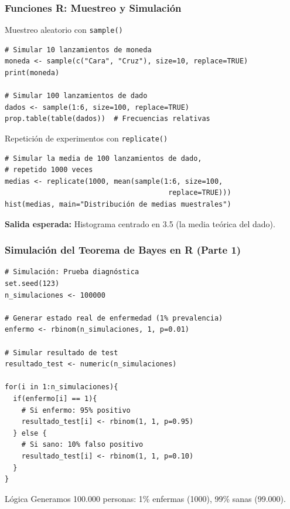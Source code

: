 \documentclass[aspectratio=169,11pt]{beamer}
\begin{document}
\begin{frame}[fragile]
\frametitle{Funciones R: Muestreo y Simulación}

\begin{block}{Muestreo aleatorio con \texttt{sample()}}
\begin{lstlisting}
# Simular 10 lanzamientos de moneda
moneda <- sample(c("Cara", "Cruz"), size=10, replace=TRUE)
print(moneda)

# Simular 100 lanzamientos de dado
dados <- sample(1:6, size=100, replace=TRUE)
prop.table(table(dados))  # Frecuencias relativas
\end{lstlisting}
\end{block}

\pause
\begin{block}{Repetición de experimentos con \texttt{replicate()}}
\begin{lstlisting}
# Simular la media de 100 lanzamientos de dado,
# repetido 1000 veces
medias <- replicate(1000, mean(sample(1:6, size=100,
                                       replace=TRUE)))
hist(medias, main="Distribución de medias muestrales")
\end{lstlisting}
\end{block}

\pause
\vspace{0.2cm}
\textbf{Salida esperada:} Histograma centrado en 3.5 (la media teórica del dado).
\end{frame}

\begin{frame}[fragile]
\frametitle{Simulación del Teorema de Bayes en R (Parte 1)}

\begin{lstlisting}[basicstyle=\ttfamily\tiny]
# Simulación: Prueba diagnóstica
set.seed(123)
n_simulaciones <- 100000

# Generar estado real de enfermedad (1% prevalencia)
enfermo <- rbinom(n_simulaciones, 1, p=0.01)

# Simular resultado de test
resultado_test <- numeric(n_simulaciones)

for(i in 1:n_simulaciones){
  if(enfermo[i] == 1){
    # Si enfermo: 95% positivo
    resultado_test[i] <- rbinom(1, 1, p=0.95)
  } else {
    # Si sano: 10% falso positivo
    resultado_test[i] <- rbinom(1, 1, p=0.10)
  }
}
\end{lstlisting}

\pause
\begin{exampleblock}{Lógica}
  Generamos 100.000 personas: 1\% enfermas (1000), 99\% sanas (99.000).
\end{exampleblock}
\end{frame}
\end{document}
